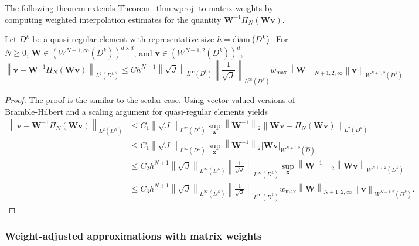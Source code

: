 \documentclass{siamart0216}
\newcommand{\nor}[1]{\left\| #1 \right\|}
\newcommand{\LRp}[1]{\left( #1 \right)}
\newcommand{\LRb}[1]{\left| #1 \right|}
\newcommand{\Lk}{L^2\LRp{D^k}}
\newcommand{\Dhat}{\widehat{D}}
\newcommand{\LinfDk}{L^{\infty}\LRp{D^k}}
\begin{document}
The following theorem extends Theorem~\ref{thm:wproj} to matrix weights by computing weighted interpolation estimates for the quantity $\bm{W}^{-1}\Pi_N\LRp{\bm{W}\bm{v}}$.  
\begin{theorem}
Let $D^k$ be a quasi-regular element with representative size $h = {\rm diam}\LRp{D^k}$. For $N \geq 0$, $\bm{W} \in \LRp{W^{N+1,\infty}\LRp{D^k}}^{d\times d}$, and $\bm{v}\in \LRp{W^{N+1,2}\LRp{D^k}}^d$, 
\[
\nor{\bm{v} - \bm{W}^{-1}\Pi_N\LRp{\bm{W}\bm{v}}}_{\Lk} \leq Ch^{N+1} \nor{{\sqrt{J}}}_{\LinfDk}\nor{\frac{1}{\sqrt{J}}}_{\LinfDk}\tilde{w}_{\max}\nor{\bm{W}}_{N+1,2,\infty} \nor{\bm{v}}_{W^{N+1,2}\LRp{D^k}}
\]
\label{thm:wwproj}
\end{theorem}
\begin{proof}
The proof is the similar to the scalar case.  Using vector-valued versions of Bramble-Hilbert and a scaling argument for quasi-regular elements yields
\begin{align*}
\nor{\bm{v} - \bm{W}^{-1}\Pi_N\LRp{\bm{W}\bm{v}}}_{\Lk} &\leq C_1 \nor{\sqrt{J}}_{\LinfDk} \sup_{\bm{x}}\nor{\bm{W}^{-1}}_{2} \nor{\bm{W}\bm{v} - \Pi_N\LRp{\bm{W}\bm{v}}}_{\Lk}\\
&\leq C_1 \nor{{\sqrt{J}}}_{\LinfDk} \sup_{\bm{x}}\nor{\bm{W}^{-1}}_{2} \LRb{\bm{W}\bm{v}}_{W^{N+1,2}\LRp{\Dhat}}\\
&\leq C_2 h^{N+1}\nor{{\sqrt{J}}}_{\LinfDk}\nor{\frac{1}{\sqrt{J}}}_{\LinfDk} \sup_{\bm{x}}\nor{\bm{W}^{-1}}_{2} \nor{\bm{W}\bm{v}}_{W^{N+1,2}\LRp{D^k}}\\
&\leq C_3 h^{N+1}\nor{{\sqrt{J}}}_{\LinfDk}\nor{\frac{1}{\sqrt{J}}}_{\LinfDk} \tilde{w}_{\max} \nor{\bm{W}}_{{N+1,2,\infty}}\nor{\bm{v}}_{W^{N+1,2}\LRp{D^k}}.
\end{align*}
\end{proof}

\subsubsection{Weight-adjusted approximations with matrix weights}
\label{sec:mwadgprop}
\end{document}
